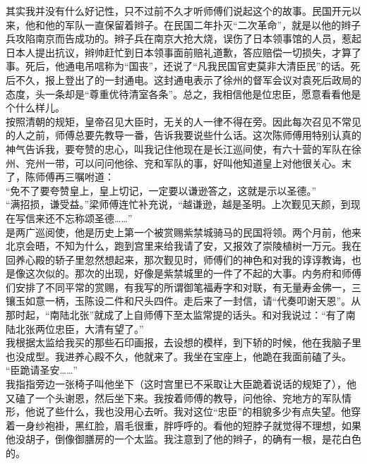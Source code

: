 其实我并没有什么好记性，只不过前不久才听师傅们说起这个的故事。民国开元以来，他和他的军队一直保留着辫子。在民国二年扑灭“二次革命”，就是以他的辫子兵攻陷南京而告成功的。辫子兵在南京大抢大烧，误伤了日本领事馆的人员，惹起日本人提出抗议，辫帅赶忙到日本领事面前赔礼道歉，答应赔偿一切损失，才算了事。死后，他通电吊唁称为“国丧”，还说了“凡我民国官吏莫非大清臣民”的话。死后不久，报上登出了的一封通电。这封通电表示了徐州的督军会议对袁死后政局的态度，头一条却是“尊重优待清室各条”。总之，我相信他是位忠臣，愿意看看他是个什么样儿。\\

按照清朝的规矩，皇帝召见大臣时，无关的人一律不得在旁。因此每次召见不常见的人之前，师傅总要先教导一番，告诉我要说些什么话。这次陈师傅用特别认真的神气告诉我，要夸赞的忠心，叫我记住他现在是长江巡间使，有六十营的军队在徐州、兖州一带，可以问问他徐、兖和军队的事，好叫他知道皇上对他很关心。末了，陈师傅再三嘱咐道：\\

“免不了要夸赞皇上，皇上切记，一定要以谦逊答之，这就是示以圣德。”\\

“满招损，谦受益。”梁师傅连忙补充说，“越谦逊，越是圣明。上次觐见天颜，到现在写信来还不忘称颂圣德……”\\

是两广巡阅使，他是历史上第一个被赏赐紫禁城骑马的民国将领。两个月前，他来北京会晤，不知为什么，跑到宫里来给我请了安，又报效了崇陵植树一万元。我在回养心殿的轿子里忽然想起来，那次觐见时，师傅们的神色和对我的谆谆教诲，也是像这次似的。那次的出现，好像是紫禁城里的一件了不起的大事。内务府和师傅们安排了不同平常的赏赐，有我写的所谓御笔福寿字和对联，有无量寿金佛一，三镶玉如意一柄，玉陈设二件和尺头四件。走后来了一封信，请“代奏叩谢天恩”。从那时起，“南陆北张”就成了上自师傅下至太监常提的话头。和对我说过：“有了南陆北张两位忠臣，大清有望了。”\\

我根据太监给我买的那些石印画报，去设想的模样，到下轿的时候，他在我脑子里也没成型。我进养心殿不久，他就来了。我坐在宝座上，他跪在我面前磕了头。\\

“臣跪请圣安……”\\

我指指旁边一张椅子叫他坐下（这时宫里已不采取让大臣跪着说话的规矩了），他又磕了一个头谢恩，然后坐下来。我按着师傅的教导，问他徐、兖地方的军队情形，他说了些什么，我也没用心去听。我对这位“忠臣”的相貌多少有点失望。他穿着一身纱袍褂，黑红脸，眉毛很重，胖呼呼的。看他的短脖子就觉得不理想，如果他没胡子，倒像御膳房的一个太监。我注意到了他的辫子，的确有一根，是花白色的。\\

